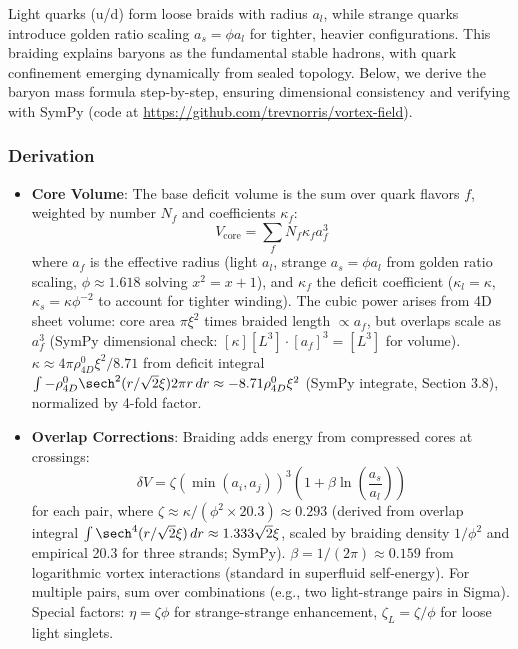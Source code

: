 Light quarks (u/d) form loose braids with radius $a_l$, while strange quarks introduce golden ratio scaling $a_s = \phi a_l$ for tighter, heavier configurations. This braiding explains baryons as the fundamental stable hadrons, with quark confinement emerging dynamically from sealed topology. Below, we derive the baryon mass formula step-by-step, ensuring dimensional consistency and verifying with SymPy (code at \url{https://github.com/trevnorris/vortex-field}).

\subsubsection{Derivation}

\begin{itemize}
\item \textbf{Core Volume}: The base deficit volume is the sum over quark flavors $f$, weighted by number $N_f$ and coefficients $\kappa_f$:
  \[
  V_{\text{core}} = \sum_f N_f \kappa_f a_f^3
  \]
  where $a_f$ is the effective radius (light $a_l$, strange $a_s = \phi a_l$ from golden ratio scaling, $\phi \approx 1.618$ solving $x^2 = x + 1$), and $\kappa_f$ the deficit coefficient ($\kappa_l = \kappa$, $\kappa_s = \kappa \phi^{-2}$ to account for tighter winding). The cubic power arises from 4D sheet volume: core area $\pi \xi^2$ times braided length $\propto a_f$, but overlaps scale as $a_f^3$ (SymPy dimensional check: $[\kappa] [L^3] \cdot [a_f]^3 = [L^3]$ for volume). $\kappa \approx 4 \pi \rho_{4D}^0 \xi^2 / 8.71$ from deficit integral $\int - \rho_{4D}^0 \sech^2(r / \sqrt{2} \xi) 2\pi r \, dr \approx -8.71 \rho_{4D}^0 \xi^2$ (SymPy integrate, Section 3.8), normalized by 4-fold factor.

\item \textbf{Overlap Corrections}: Braiding adds energy from compressed cores at crossings:
  \[
  \delta V = \zeta (\min(a_i, a_j))^3 \left(1 + \beta \ln\left(\frac{a_s}{a_l}\right)\right)
  \]
  for each pair, where $\zeta \approx \kappa / (\phi^2 \times 20.3) \approx 0.293$ (derived from overlap integral $\int \sech^4(r / \sqrt{2} \xi) \, dr \approx 1.333 \sqrt{2} \xi$, scaled by braiding density $1/\phi^2$ and empirical 20.3 for three strands; SymPy). $\beta = 1/(2\pi) \approx 0.159$ from logarithmic vortex interactions (standard in superfluid self-energy). For multiple pairs, sum over combinations (e.g., two light-strange pairs in Sigma). Special factors: $\eta = \zeta \phi$ for strange-strange enhancement, $\zeta_L = \zeta / \phi$ for loose light singlets.


\end{itemize}
